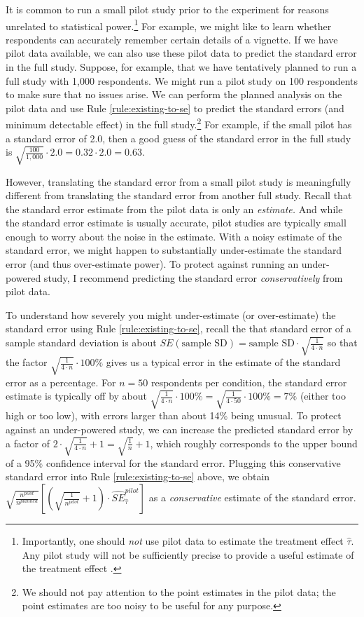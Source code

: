 \documentclass[12pt]{article}
\begin{document}
It is common to run a small pilot study prior to the experiment for reasons unrelated to statistical power.\footnote{
  Importantly, one should \textit{not} use pilot data to estimate the treatment effect $\widehat{\tau}$. 
  Any pilot study will not be sufficiently precise to provide a useful estimate of the treatment effect \cite{Leon2011, Albers2018}.
  }
For example, we might like to learn whether respondents can accurately remember certain details of a vignette. 
If we have pilot data available, we can also use these pilot data to predict the standard error in the full study. 
Suppose, for example, that we have tentatively planned to run a full study with 1,000 respondents. 
We might run a pilot study on 100 respondents to make sure that no issues arise. 
We can perform the planned analysis on the pilot data and use Rule \ref{rule:existing-to-se} to predict the standard errors (and minimum detectable
effect) in the full study.\footnote{We should not pay attention to the
point estimates in the pilot data; the point estimates are too noisy to
be useful for any purpose.} 
For example, if the small pilot has a standard error of 2.0, then a good guess of the standard error in the full study is $\sqrt{\frac{100}{1,000}} \cdot 2.0 = 0.32 \cdot 2.0 = 0.63$.

However, translating the standard error from a small pilot study is meaningfully different from translating the standard error from another full study. Recall that the standard error estimate from the pilot data is only an \emph{estimate.} 
And while the standard error estimate is usually accurate, pilot studies are typically small enough to worry about the noise in the estimate.
With a noisy estimate of the standard error, we might happen to substantially under-estimate the standard error (and thus over-estimate power). 
To protect against running an under-powered study, I recommend predicting the standard error \emph{conservatively} from pilot data. 

To understand how severely you might under-estimate (or over-estimate) the standard error using Rule \ref{rule:existing-to-se}, recall the that standard error of a sample standard deviation is about $SE\left( \text{sample SD} \right) = \text{sample SD} \cdot \sqrt{\frac{1}{4 \cdot n}}$ so that the factor $\sqrt{\frac{1}{4 \cdot n}} \cdot 100\%$ gives us a typical error in the estimate of the standard error as a percentage. 
For $n = 50$ respondents per condition, the standard error estimate is typically off by about $\sqrt{\frac{1}{4 \cdot n}} \cdot 100\% = \sqrt{\frac{1}{4 \cdot 50}} \cdot 100\%= 7\%$ (either too high or too low), with errors larger than about 14\% being unusual. 
To protect against an under-powered study, we can increase the predicted standard error by a factor of $2 \cdot \sqrt{\frac{1}{4 \cdot n}} + 1 = \sqrt{\frac{1}{n}} + 1$, which roughly corresponds to the upper bound of a 95\% confidence interval for the standard error. 
Plugging this conservative standard error into Rule \ref{rule:existing-to-se} above, we obtain $\sqrt{\frac{n^{pilot}}{n^{planned}}}\left\lbrack \left( \sqrt{\frac{1}{n^{pilot}}} + 1 \right) \cdot {\widehat{SE}}_{\widehat{\tau}}^{pilot} \right\rbrack$
as a \emph{conservative} estimate of the standard error. 
\end{document}

